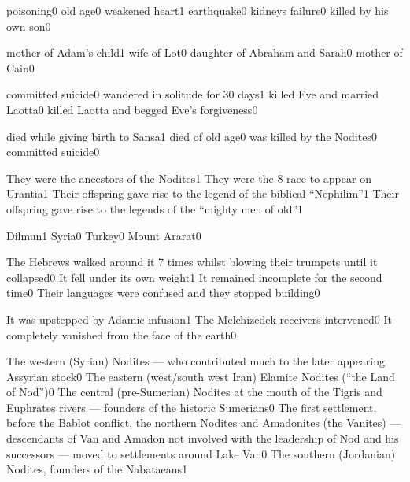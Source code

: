 {poisoning}{0}
{old age}{0}
{weakened heart}{1}
{earthquake}{0}
{kidneys failure}{0}
{killed by his own son}{0}
\qstop

{mother of Adam's child}{1}
{wife of Lot}{0}
{daughter of Abraham and Sarah}{0}
{mother of Cain}{0}
\qstop

{committed suicide}{0}
{wandered in solitude for 30 days}{1}
{killed Eve and married Laotta}{0}
{killed Laotta and begged Eve's forgiveness}{0}
\qstop


{died while giving birth to Sansa}{1}
{died of old age}{0}
{was killed by the Nodites}{0}
{committed suicide}{0}
\qstop


{They were the ancestors of the Nodites}{1}
{They were the 8 race to appear on Urantia}{1}
{Their offspring gave rise to the legend of the biblical ``Nephilim''}{1}
{Their offspring gave rise to the legends of the ``mighty men of old''}{1}
\qstop

{Dilmun}{1}
{Syria}{0}
{Turkey}{0}
{Mount Ararat}{0}
\qstop

{The Hebrews walked around it 7 times whilst blowing their trumpets until it collapsed}{0}
{It fell under its own weight}{1}
{It remained incomplete for the second time}{0}
{Their languages were confused and they stopped building}{0}
\qstop

{It was upstepped by Adamic infusion}{1}
{The Melchizedek receivers intervened}{0}
{It completely vanished from the face of the earth}{0}
\qstop

{The western (Syrian) Nodites --- who contributed much to the later appearing Assyrian stock}{0}
{The eastern (west/south west Iran) Elamite Nodites (``the Land of Nod'')}{0}
{The central (pre-Sumerian) Nodites at the mouth of the Tigris and Euphrates rivers --- founders of the historic Sumerians}{0}
{The first settlement, before the Bablot conflict, the northern Nodites and Amadonites (the Vanites) --- descendants of Van and Amadon not involved with the leadership of Nod and his successors --- moved to settlements around Lake Van}{0}
{The southern (Jordanian) Nodites, founders of the Nabataeans}{1}
\qstop

